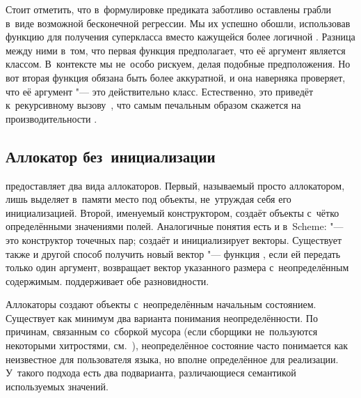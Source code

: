 Стоит отметить, что в~формулировке предиката  заботливо оставлены
грабли в~виде возможной бесконечной регрессии. Мы их успешно обошли, использовав
функцию  для получения суперкласса вместо
кажущейся более логичной . Разница между ними в~том, что
первая функция предполагает, что её аргумент является классом. В~контексте
 мы не~особо рискуем, делая подобные предположения. Но вот вторая
функция обязана быть более аккуратной, и она наверняка проверяет, что её
аргумент "--- это действительно класс. Естественно, это приведёт к~рекурсивному
вызову~, что самым печальным образом скажется на производительности
{\Meroonet}.


\subsection{Аллокатор без~инициализации}\label{objects/accomp/ssect:allocator}

{\Meroonet} предоставляет два вида аллокаторов. Первый, называемый просто
аллокатором, лишь выделяет в~памяти место под объекты, не~утруждая себя его
инициализацией. Второй, именуемый конструктором, создаёт объекты с~чётко
определёнными значениями полей. Аналогичные понятия есть и в~Scheme:
 "--- это конструктор точечных пар;  создаёт и
инициализирует векторы. Существует также и другой способ получить новый вектор
"--- функция , если ей передать только один аргумент, возвращает
вектор указанного размера с~неопределённым содержимым. {\Meroonet} поддерживает
обе разновидности.

Аллокаторы создают объекты с~неопределённым начальным состоянием. Существует как
минимум два варианта понимания неопределённости. По причинам, связанным
со~сборкой мусора (если сборщики не~пользуются некоторыми хитростями,
см.~\cite{bw88}), неопределённое состояние часто понимается как неизвестное для
пользователя языка, но вполне определённое для реализации. У~такого подхода есть
два подварианта, различающиеся семантикой используемых значений.

